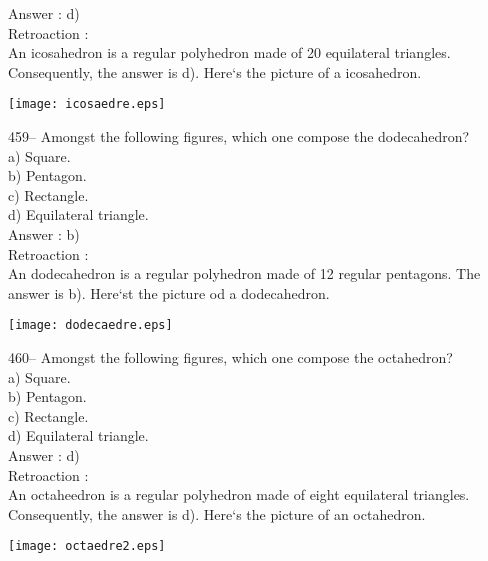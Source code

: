﻿\documentclass[letterpaper, 12pt]{article}
\begin{document}
Answer : d)\\

Retroaction : \\
An icosahedron  is a regular polyhedron made of 20 equilateral triangles.  Consequently, the answer is d).  
Here`s the picture of a icosahedron.\\
    \begin{center}
    \texttt{[image: icosaedre.eps]}
    \end{center}


459-- Amongst the following figures, which one compose the dodecahedron?\\
a) Square.\\
b) Pentagon.\\
c) Rectangle.\\
d) Equilateral triangle.\\

Answer : b)\\

Retroaction : \\
An dodecahedron is a regular polyhedron made of 12 regular pentagons.  The answer is b).  Here`st the picture od a dodecahedron.\\
    \begin{center}
    \texttt{[image: dodecaedre.eps]}
    \end{center}


460-- Amongst the following figures, which one compose the octahedron?\\
a) Square.\\
b) Pentagon.\\
c) Rectangle.\\
d) Equilateral triangle.\\

Answer : d)\\

Retroaction : \\
An octaheedron is a regular polyhedron made of eight equilateral triangles.  Consequently, the answer is d).  Here`s the picture of an octahedron.\\
    \begin{center}
    \texttt{[image: octaedre2.eps]}
    \end{center}
\end{document}
